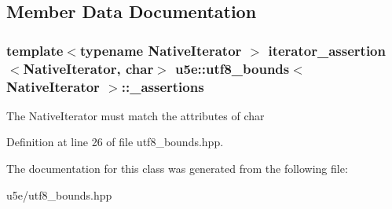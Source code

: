 \subsection{Member Data Documentation}
\subsubsection[{\texorpdfstring{\+\_\+assertions}{_assertions}}]{\setlength{\rightskip}{0pt plus 5cm}template$<$typename Native\+Iterator $>$ {\bf iterator\+\_\+assertion}$<$Native\+Iterator, char$>$ {\bf u5e\+::utf8\+\_\+bounds}$<$ Native\+Iterator $>$\+::\+\_\+assertions}\hypertarget{classu5e_1_1utf8__bounds_a7469c5f9eaf73b8852039329279e3c0e}{}\label{classu5e_1_1utf8__bounds_a7469c5f9eaf73b8852039329279e3c0e}
The Native\+Iterator must match the attributes of char 

Definition at line 26 of file utf8\+\_\+bounds.\+hpp.



The documentation for this class was generated from the following file\+:\begin{DoxyCompactItemize}
\item 
u5e/utf8\+\_\+bounds.\+hpp\end{DoxyCompactItemize}
